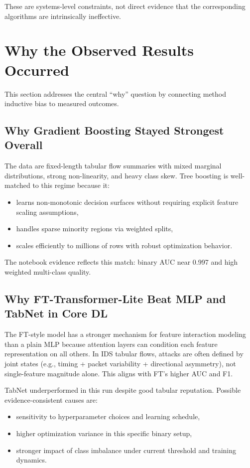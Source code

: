 \documentclass[10pt,journal]{IEEEtran}
\begin{document}
These are systems-level constraints, not direct evidence that the corresponding algorithms are intrinsically ineffective.

\section{Why the Observed Results Occurred}
This section addresses the central ``why'' question by connecting method inductive bias to measured outcomes.

\subsection{Why Gradient Boosting Stayed Strongest Overall}
The data are fixed-length tabular flow summaries with mixed marginal distributions, strong non-linearity, and heavy class skew. Tree boosting is well-matched to this regime because it:

\begin{itemize}
\item learns non-monotonic decision surfaces without requiring explicit feature scaling assumptions,
\item handles sparse minority regions via weighted splits,
\item scales efficiently to millions of rows with robust optimization behavior.
\end{itemize}

The notebook evidence reflects this match: binary AUC near 0.997 and high weighted multi-class quality.

\subsection{Why FT-Transformer-Lite Beat MLP and TabNet in Core DL}
The FT-style model has a stronger mechanism for feature interaction modeling than a plain MLP because attention layers can condition each feature representation on all others. In IDS tabular flows, attacks are often defined by joint states (e.g., timing + packet variability + directional asymmetry), not single-feature magnitude alone. This aligns with FT's higher AUC and F1.

TabNet underperformed in this run despite good tabular reputation. Possible evidence-consistent causes are:
\begin{itemize}
\item sensitivity to hyperparameter choices and learning schedule,
\item higher optimization variance in this specific binary setup,
\item stronger impact of class imbalance under current threshold and training dynamics.
\end{itemize}
\end{document}
